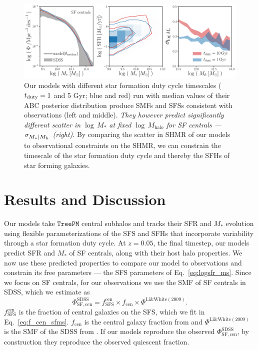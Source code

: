 \documentclass[12pt, letterpaper, preprint, tighten]{aastex62}
\newcommand{\beq}{\begin{equation}}
\newcommand{\eeq}{\end{equation}}
\newcommand{\siglogm}{\sigma_{\scaleto{M_*|M_h}{8pt}}}
\begin{document}
\begin{figure}
\begin{center}
\includegraphics[width=\textwidth]{figs/qaplot_abc.pdf}
    \caption{Our models with different star formation duty cycle timescales
    ($t_{\rm duty} = 1$ and 5 Gyr; blue and red) run with median values of 
    their ABC posterior distribution produce SMFs and SFSs consistent with 
    observations (left and middle). \emph{They however predict significantly 
    different scatter in $\log\,M_*$ at fixed $\log\,M_\mathrm{halo}$ for SF 
    centrals --- $\siglogm$ (right)}. By comparing the scatter in SHMR of our 
    models to observational constraints on the SHMR, we can constrain the 
    timescale of the star formation duty cycle and thereby the SFHs of star
    forming galaxies.
    }
\label{fig:abc_demo}
\end{center}
\end{figure}

\section{Results and Discussion} \label{sec:results}
Our models take $\mathtt{TreePM}$ central subhalos and tracks their SFR
and $M_*$ evolution using flexible parameterizations of the SFS and SFHs
that incorporate variability through a star formation duty cycle.
At $z = 0.05$, the final timestep, our models predict SFR and $M_*$ of SF
centrals, along with their host halo properties. We now use these predicted 
properties to compare our model to observations and constrain its free
parameters --- the SFS parameters of Eq.~\ref{eq:logsfr_ms}. Since we focus
on SF centrals, for our observations we use the SMF of SF centrals in SDSS, 
which we estimate as \beq \label{eq:smf_sf_cen}
\Phi^\mathrm{SDSS}_\mathrm{SF,cen} = f^\mathrm{cen}_\mathrm{SFS} \times f_\mathrm{cen} \times \Phi^\mathrm{Li\&White(2009)}.
\eeq
$f^\mathrm{cen}_\mathrm{SFS}$ is the fraction of central galaxies on the
SFS, which we fit in Eq.~\ref{eq:f_cen_sfms}. $f_\mathrm{cen}$ is the
central galaxy fraction from \cite{wetzel2013} and $\Phi^\mathrm{Li\&White(2009)}$
is the SMF of the SDSS from \cite{li2009}. If our models reproduce the
observed $\Phi^\mathrm{SDSS}_\mathrm{SF,cen}$, by construction they reproduce
the observed quiescent fraction.
\end{document}
